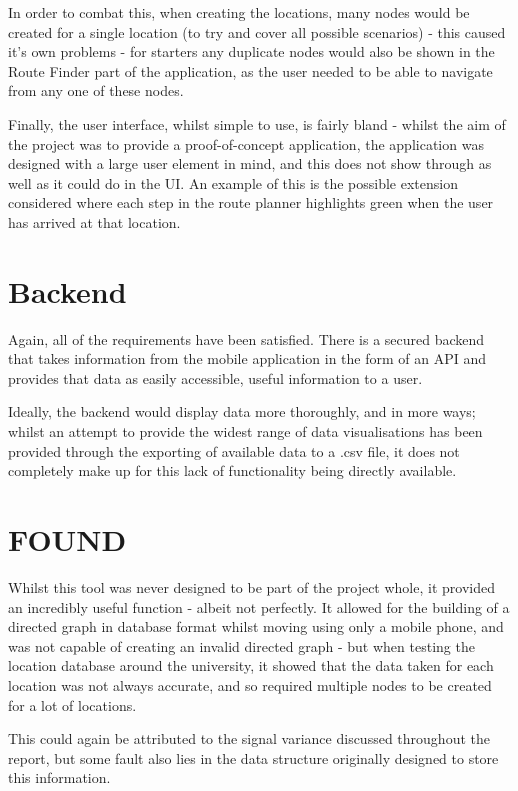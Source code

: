 \documentclass[11pt]{informatics-report}
\begin{document}
In order to combat this, when creating the locations, many nodes would be created for a single location (to try and cover all possible scenarios) - this caused it's own problems - for starters any duplicate nodes would also be shown in the Route Finder part of the application, as the user needed to be able to navigate from any one of these nodes. 

Finally, the user interface, whilst simple to use, is fairly bland - whilst the aim of the project was to provide a proof-of-concept application, the application was designed with a large user element in mind, and this does not show through as well as it could do in the UI. An example of this is the possible extension considered where each step in the route planner highlights green when the user has arrived at that location.

\section{Backend}

Again, all of the requirements have been satisfied. There is a secured backend that takes information from the mobile application in the form of an API and provides that data as easily accessible, useful information to a user. 

Ideally, the backend would display data more thoroughly, and in more ways; whilst an attempt to provide the widest range of data visualisations has been provided through the exporting of available data to a .csv file, it does not completely make up for this lack of functionality being directly available.

\section{FOUND}

Whilst this tool was never designed to be part of the project whole, it provided an incredibly useful function - albeit not perfectly. It allowed for the building of a directed graph in database format whilst moving using only a mobile phone, and was not capable of creating an invalid directed graph - but when testing the location database around the university, it showed that the data taken for each location was not always accurate, and so required multiple nodes to be created for a lot of locations.

This could again be attributed to the signal variance discussed throughout the report, but some fault also lies in the data structure originally designed to store this information.
\end{document}
